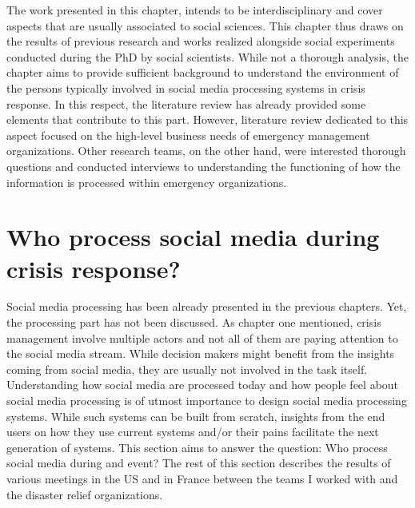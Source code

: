 The work presented in this chapter, intends to be interdisciplinary and cover aspects that are usually associated to social sciences.
This chapter thus draws on the results of previous research and works realized  alongside social experiments conducted during the PhD by social scientists.
While not a thorough analysis, the chapter aims to provide sufficient background to understand the environment of the persons typically involved in social media processing systems in crisis response.
In this respect, the literature review has already provided some elements that contribute to this part.
However, literature review dedicated to this aspect focused on the high-level business needs of emergency management organizations.
Other research teams, on the other hand, were interested thorough questions and conducted
interviews to understanding the functioning of how the information is processed within emergency organizations.

\section{Who process social media during crisis response?}
Social media processing has been already presented in the previous chapters.
Yet, the processing part has not been discussed.
As chapter one mentioned, crisis management involve multiple actors and not all of them are paying attention to the social media stream.
While decision makers might benefit from the insights coming from social media, they are usually not involved in the task itself.
Understanding how social media are processed today and how people feel about social media processing is of utmost importance to design social media processing systems.
While such systems can be built from scratch, insights from the end users on how they use current systems and/or their pains facilitate the next generation of systems.
This section aims to answer the question: Who process social media during and event?
The rest of this section describes the results of various meetings in the US and in France between the teams I worked with and the disaster relief organizations.

